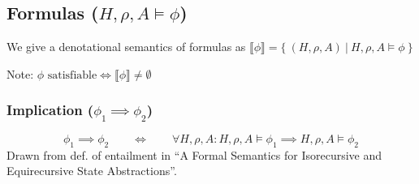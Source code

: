 \documentclass[11pt,a4paper]{article}
\newcommand{\evalphix}[4]{#1,#2,#3 \vDash #4}
\newcommand{\evalphi}{\evalphix H \rho A}
\newcommand{\valphi}[1]{\llbracket #1 \rrbracket}
\begin{document}
\subsection{Formulas ($\evalphi \phi$)}


We give a denotational semantics of formulas as $\valphi {\phi} = \{~ (H,\rho,A) ~|~ \evalphi {\phi} ~\}$

Note: $\phi \text{ satisfiable} \iff \valphi {\phi} \neq \emptyset$

\subsubsection{Implication ($\phi_1 \implies \phi_2$)}

\begin{equation*}
\phi_1 \implies \phi_2
\quad\quad \iff \quad\quad
\forall H, \rho, A: \evalphi \phi_1 \implies \evalphi \phi_2
\end{equation*}
Drawn from def. of entailment in ``A Formal Semantics for Isorecursive and Equirecursive State Abstractions''.
\end{document}
